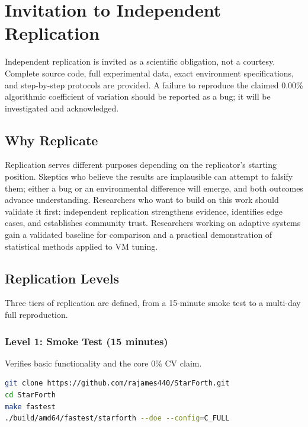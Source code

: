 
\section{Invitation to Independent Replication}
\label{sec:replication-invite}

Independent replication is invited as a scientific obligation, not a courtesy.
Complete source code, full experimental data, exact environment specifications,
and step-by-step protocols are provided. A failure to reproduce the claimed
0.00\% algorithmic coefficient of variation should be reported as a bug; it
will be investigated and acknowledged.

\subsection{Why Replicate}

Replication serves different purposes depending on the replicator's starting
position. Skeptics who believe the results are implausible can attempt to
falsify them; either a bug or an environmental difference will emerge, and both
outcomes advance understanding. Researchers who want to build on this work
should validate it first: independent replication strengthens evidence,
identifies edge cases, and establishes community trust. Researchers working on
adaptive systems gain a validated baseline for comparison and a practical
demonstration of statistical methods applied to VM tuning.

\subsection{Replication Levels}

Three tiers of replication are defined, from a 15-minute smoke test to a
multi-day full reproduction.

\subsubsection{Level 1: Smoke Test (15 minutes)}

Verifies basic functionality and the core 0\% CV claim.

\begin{lstlisting}[language=bash]
git clone https://github.com/rajames440/StarForth.git
cd StarForth
make fastest
./build/amd64/fastest/starforth --doe --config=C_FULL
\end{lstlisting}


